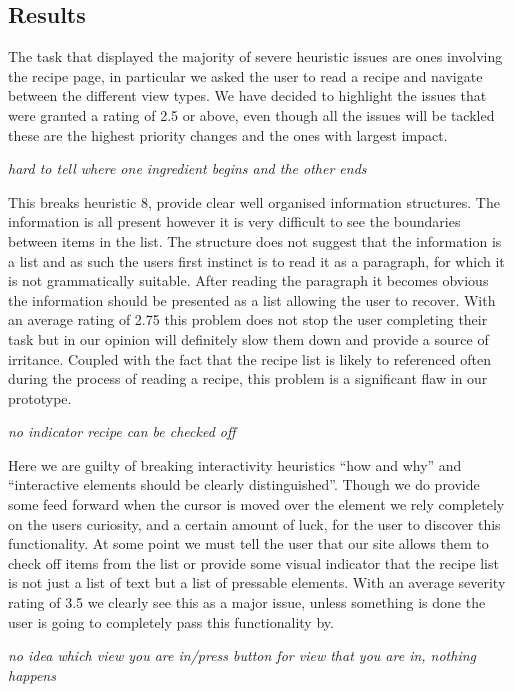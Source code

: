 \subsection{Results}
The task that displayed the majority of severe heuristic issues are ones involving the recipe page, in particular we asked the user to read a recipe and navigate between the different view types. We have decided to highlight the issues that were granted a rating of 2.5 or above, even though all the issues will be tackled these are the highest priority changes and the ones with largest impact.
\begin{center}
\emph{hard to tell where one ingredient begins and the other ends}
\end{center}
This breaks heuristic 8, provide clear well organised information structures. The information is all present however it is very difficult to see the boundaries between items in the list. The structure does not suggest that the information is a list and as such the users first instinct is to read it as a paragraph, for which it is not grammatically suitable. After reading the paragraph it becomes obvious the information should be presented as a list allowing the user to recover. With an average rating of 2.75 this problem does not stop the user completing their task but in our opinion will definitely slow them down and provide a source of irritance. Coupled with the fact that the recipe list is likely to referenced often during the process of reading a recipe, this problem is a significant flaw in our prototype.
\begin{center}
\emph{no indicator recipe can be checked off}
\end{center}
Here we are guilty of breaking interactivity heuristics “how and why” and “interactive elements should be clearly distinguished”. Though we do provide some feed forward when the cursor is moved over the element we rely completely on the users curiosity, and a certain amount of luck, for the user to discover this functionality. At some point we must tell the user that our site allows them to check off items from the list or provide some visual indicator that the recipe list is not just a list of text but a list of pressable elements. With an average severity rating of 3.5 we clearly see this as a major issue, unless something is done the user is going to completely pass this functionality by.
\begin{center}
\emph{no idea which view you are in/press button for view that you are in, nothing happens}
\end{center}
